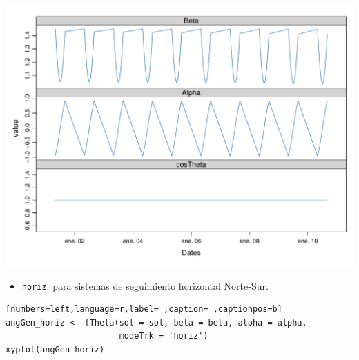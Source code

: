 \begin{itemize}
\begin{center}
\includegraphics[width=\textwidth]{figuras/codigo-fthetatwo.pdf}
\end{center}
\begin{itemize}
\item \texttt{horiz}: para sistemas de seguimiento horizontal Norte-Sur.
\end{itemize}
\begin{lstlisting}[numbers=left,language=r,label= ,caption= ,captionpos=b]
angGen_horiz <- fTheta(sol = sol, beta = beta, alpha = alpha,
                       modeTrk = 'horiz')
xyplot(angGen_horiz)
\end{lstlisting}


\end{itemize}
